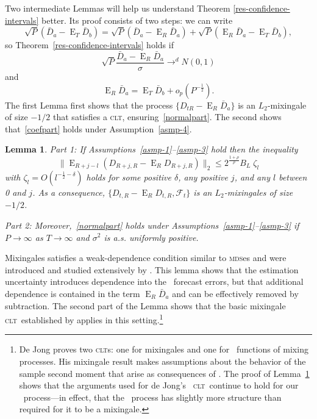 \documentclass[11pt]{article}
\newtheorem{lem}[thm]{Lemma}
\DeclareMathOperator{\E}{E}
\newcommand{\oosA}{\bar{D}_a}
\newcommand{\oosB}{\bar{D}_b}
\newcommand{\couplingConstant}{\ensuremath{2^{\frac{1+\rho}{\rho}} B_L}}
\newcommand{\mds}{\textsc{mds}}
\newcommand{\clt}{\textsc{clt}}
\begin{document}
Two intermediate Lemmas will help us understand Theorem
\ref{res-confidence-intervals} better.  Its proof consists of two
steps: we can write
\begin{equation}
  \sqrt{P} (\oosA - \E_T \oosB) = \sqrt{P} (\oosA - \E_R
  \oosA) + \sqrt{P} (\E_R \oosA - \E_T \oosB),
\end{equation}
so Theorem~\ref{res-confidence-intervals} holds if
\begin{equation}\label{normalpart}
  \sqrt{P}\frac{\oosA - \E_R \oosA}{\sigma} \to^d N(0,1)
\end{equation}
and
\begin{equation}\label{coefpart}
  \E_R \oosA = \E_T \oosB + o_p(P^{-\frac12}).
\end{equation}
The first Lemma first shows that the process $\{D_{tR} - \E_R \oosA\}$
is an $L_2$-mixingale of size $-1/2$ that satisfies a \clt,
ensuring~\eqref{normalpart}.  The second shows that~\eqref{coefpart}
holds under Assumption~\ref{asmp-4}.

\begin{lem}\label{res-mixingale}
  Part 1: If Assumptions~\ref{asmp-1}--\ref{asmp-3} hold then the inequality
  \begin{equation}\label{mixingaleR}
    \lVert \E_{R+j-l}(D_{R+j,R} - \E_R D_{R+j,R}) \rVert_2 \leq
    \couplingConstant \;
    \zeta_l
  \end{equation}
  with $\zeta_l = O(l^{-\frac12 - \delta})$ holds for some positive
  $\delta$, any positive $j$, and any $l$ between 0 and $j$.  As a
  consequence, $\{D_{t,R} - \E_R D_{t,R}, \mathcal F_t\}$ is an
  $L_2$-mixingales of size $-1/2$.  

  \noindent Part
  2: Moreover,~\eqref{normalpart} holds under
  Assumptions~\ref{asmp-1}--\ref{asmp-3} if $P \to \infty$ as $T \to
  \infty$ and $\sigma^2$ is a.s. uniformly positive.
\end{lem}

Mixingales satisfies a weak-dependence condition similar to \mds es
and were introduced and studied extensively by
\citet{Mcl:74,Mcl:75,Mcl:75b,Mcl:77}.  This lemma shows that the
estimation uncertainty introduces dependence into the \oos\ forecast
errors, but that additional dependence is contained in the term $\E_R
\oosA$ and can be effectively removed by subtraction.  The second
part of the Lemma shows that the basic mixingale \clt\ established by
\citet{Dej:97} applies in this setting.\footnote{De Jong proves two
  \clt s: one for mixingales and one for \ned\ functions of mixing
  processes.  His mixingale result makes assumptions about the
  behavior of the sample second moment that arise as consequences of
  \ned.  The proof of Lemma~\ref{res-mixingale} shows that the
  arguments used for de Jong's \ned\ \clt\ continue to hold for our
  \oos\ process---in effect, that the \oos\ process has slightly more
  structure than required for it to be a mixingale.}
\end{document}
